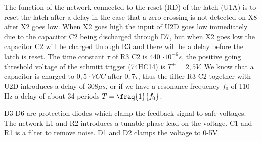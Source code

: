 The function of the network connected to the reset (RD) of the latch (U1A) is to reset the latch after a delay in the case that a zero crossing is not detected on X8 after X2 goes low. When X2 goes high the input of U2D goes low immediately due to the capacitor C2 being discharged through D7, but when X2 goes low the capacitor C2 will be charged through R3 and there will be a delay before the latch is reset. The time constant $\tau$ of R3 C2 is 440 $\cdot 10^{-6} s$, the positive going threshold voltage of the schmitt trigger (74HC14) is $T^+ = 2,5V$. We know that a capacitor is charged to $0,5 \cdot VCC$ after $0,7 \tau$, thus the filter R3 C2 together with U2D introduces a delay of 308$\mu s$, or if we have a resonance frequency $f_0$ of 110 Hz a delay of about 34 periods $T = \fraq{1}{f_0}$.

D3-D6 are protection diodes which clamp the feedback signal to safe voltages. The network L1 and R2 introduces a tunable phase lead on the voltage. C1 and R1 is a filter to remove noise. D1 and D2 clamps the voltage to 0-5V.






